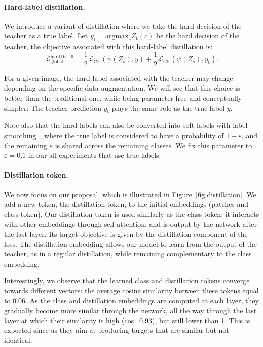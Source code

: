 \paragraph{Hard-label distillation.} %
%
We introduce a variant of distillation where we take the hard decision of the teacher as a true label.
%
Let $y_\mathrm{t}=\mathrm{argmax}_c Z_\mathrm{t}(c)$ be the hard decision of the teacher, the objective associated with 
this hard-label distillation is: %
%
\begin{equation}
    \mathcal{L}_\mathrm{global}^\mathrm{hard Distill} =  \frac{1}{2}\mathcal{L}_\mathrm{CE}(\psi(Z_s),y) +  \frac{1}{2}\mathcal{L}_\mathrm{CE}(\psi(Z_s),y_\mathrm{t}).
\end{equation}


For a given image, the hard label associated with the teacher may change depending on the specific data augmentation. 
We will see that this choice is better than the traditional one, while being parameter-free and conceptually simpler: The teacher prediction $y_\mathrm{t}$ plays the same role as the true label $y$.

Note also that the hard labels can also be converted into soft labels with label smoothing~\cite{Szegedy2016RethinkingTI}, where the true label is considered to have a probability of $1-\varepsilon$, and the remaining $\varepsilon$ is shared across the remaining classes. We fix this parameter to $\varepsilon=0.1$ in our all experiments that use true labels.  

%
\paragraph{Distillation token.} 
We now focus on our proposal, which is illustrated in Figure~\ref{fig:distillation}. 
We add a new token, the distillation token, to the initial embeddings (patches and class token).
Our distillation token is used similarly as the class token: it interacts with other embeddings through self-attention, and is output by the network after the last layer.
Its target objective is given by the distillation component of the loss. 
% 
The distillation embedding allows our model to learn from the output of the teacher, as in a regular distillation, while remaining complementary to the class embedding.
% 

Interestingly, we observe that the learned class and distillation tokens converge towards different vectors: the average cosine similarity between these tokens equal to 0.06. As the class and distillation embeddings are computed at each layer, they gradually become more similar through the network, all the way through the last layer at which their similarity is high (cos=0.93), but still lower than 1. This is expected since as they aim at producing targets that are similar but not identical. 

